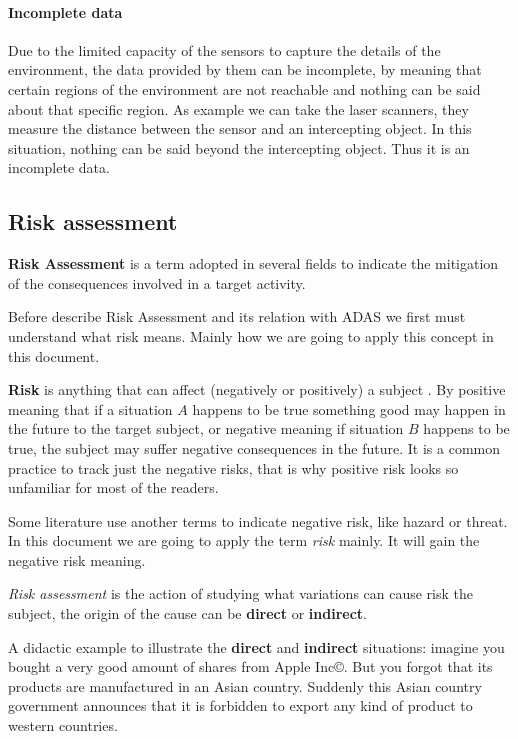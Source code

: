 \paragraph{Incomplete data} Due to the limited capacity of the sensors to capture the details of the environment, the data provided by them can be incomplete, by meaning that certain regions of the environment are not reachable and nothing can be said about that specific region. As example we can take the laser scanners, they measure the distance between the sensor and an intercepting object. In this situation, nothing can be said beyond the intercepting object. Thus it is an incomplete data.

\subsection{Risk assessment}
\label{sec:riskassessment}

\textbf{Risk Assessment} is a term adopted in several fields to indicate the mitigation of the consequences involved in a target activity. 

Before describe Risk Assessment and its relation with ADAS we first must understand what risk means. Mainly how we are going to apply this concept in this document. 

\textbf{Risk} is anything that can affect (negatively or positively) a subject \cite{mulcahy2011pmp}. By positive meaning that if a situation $A$ happens to be true something good may happen in the future to the target subject, or negative meaning if situation $B$ happens to be true, the subject may suffer negative consequences in the future. It is a common practice to track just the negative risks, that is why positive risk looks so unfamiliar for most of the readers. 

Some literature use another terms to indicate negative risk, like hazard or threat. In this document we are going to apply the term \textit{risk} mainly. It will gain the negative risk meaning.

\textit{Risk assessment} is the action of studying what variations can cause risk the subject, the origin of the cause can be \textbf{direct} or \textbf{indirect}.

A didactic example to illustrate the \textbf{direct} and \textbf{indirect} situations: imagine you bought a very good amount of shares from Apple Inc\copyright. But you forgot that its products are manufactured in an Asian country. Suddenly this Asian country government announces that it is forbidden to export any kind of product to western countries. 

